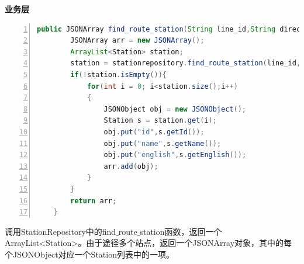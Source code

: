 \documentclass[11pt,a4paper]{article}
\begin{document}
\textbf{业务层} \\
\begin{lstlisting}[numbers = left, 
showstringspaces=false,
showspaces = false,
breaklines = true, 
language=Java]
    public JSONArray find_route_station(String line_id,String direction){
        JSONArray arr = new JSONArray();
        ArrayList<Station> station;
        station = stationrepository.find_route_station(line_id, direction);
        if(!station.isEmpty()){
            for(int i = 0; i<station.size();i++)
            {
                JSONObject obj = new JSONObject();
                Station s = station.get(i);
                obj.put("id",s.getId());
                obj.put("name",s.getName());
                obj.put("english",s.getEnglish());
                arr.add(obj);
            }
        }
        return arr;
    }
\end{lstlisting} 
调用StationRepository中的find$\_$route$\_$station函数，返回一个ArrayList<Station>。由于途径多个站点，返回一个JSONArray对象，其中的每个JSONObject对应一个Station列表中的一项。
\end{document}
